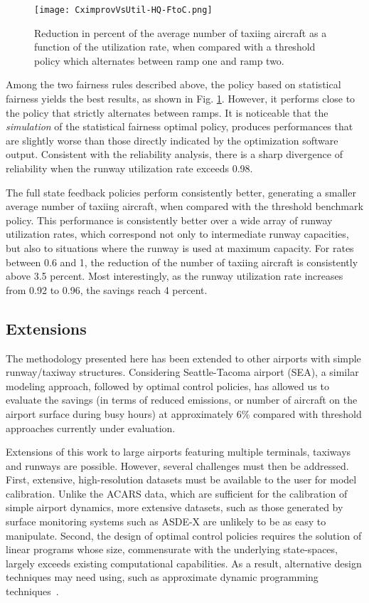 \documentclass[letterpaper]{article}
\begin{document}
\begin{figure}[ht]
\hspace{-5mm}
\texttt{[image: CximprovVsUtil-HQ-FtoC.png]}
\caption{Reduction in percent of the average number of taxiing aircraft as a function of the utilization rate,
when compared with a threshold policy which alternates between ramp one and ramp two.}
\label{f:CximprovVsUtil}
\end{figure}

Among the two fairness rules described above, the policy based on statistical fairness yields the best results, 
as shown in Fig. \ref{f:CximprovVsUtil}. However, it performs close to the policy that strictly alternates between ramps. 
It is noticeable that the \emph{simulation} of the statistical fairness optimal policy, produces performances that are slightly
 worse than those directly indicated by the optimization software output. 
 Consistent with the reliability analysis, there is a sharp divergence of reliability when the runway utilization rate exceeds 0.98.

The full state feedback policies perform consistently better, generating a smaller average number of taxiing aircraft, 
when compared with the threshold benchmark policy. This performance is consistently better over a wide array of runway utilization rates,
 which correspond not only to intermediate runway capacities, but also to situations where the runway is used at maximum capacity. 
 For rates between 0.6 and 1, the reduction of the number of taxiing aircraft is consistently above 3.5 percent. 
 Most interestingly, as the runway utilization rate increases from 0.92 to 0.96, the savings reach 4 percent.

\subsection{Extensions}
The methodology presented here has been extended to other airports with simple runway/taxiway structures. Considering Seattle-Tacoma airport (SEA),
a similar modeling approach, followed by optimal control policies, has allowed us to evaluate the savings (in terms of reduced emissions, or number of aircraft on the airport surface during busy hours) at approximately 6\% compared with threshold approaches currently under evaluation. 

Extensions of this work to large airports featuring multiple terminals, taxiways and runways are possible. However, several challenges must then be addressed. First, extensive, high-resolution datasets must be available to the user for model calibration. Unlike the ACARS data, which are sufficient for the calibration of simple airport dynamics, more extensive datasets, such as those generated by surface monitoring systems such as ASDE-X are unlikely to be as easy to manipulate. Second, the design of optimal control policies requires the solution of linear programs whose size, commensurate with the underlying state-spaces, largely exceeds existing computational capabilities. As a result, alternative design techniques may need using, such as approximate dynamic programming techniques~\cite{BeT:96}. 
\end{document}

